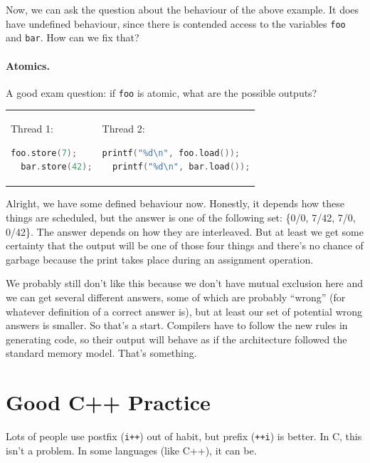 \documentclass[a4paper]{report}
\begin{document}
Now, we can ask the question about the behaviour of the above example.
It does have undefined behaviour, since there is contended access to
the variables {\tt foo} and {\tt bar}. How can we fix that?

\paragraph{Atomics.}
A good exam question: if {\tt foo} is atomic, what are the possible outputs? 
    
    \begin{tabular}{ll}
      \begin{minipage}{.25\textwidth}
        Thread 1:
        \begin{lstlisting}[language=C]
  foo.store(7);
  bar.store(42);
        \end{lstlisting}
      \end{minipage} &
      \begin{minipage}{.45\textwidth}
        Thread 2:
        \begin{lstlisting}[language=C]
  printf("%d\n", foo.load());
  printf("%d\n", bar.load());
        \end{lstlisting}
      \end{minipage}
    \end{tabular}

Alright, we have some defined behaviour now.  Honestly, it depends how these things are scheduled, but the answer is one of the following set: \{0/0, 7/42, 7/0,  0/42\}. The answer depends on how they are interleaved. But at least we get some certainty that the output will be one of those four things and there's no chance of garbage because the print takes place during an assignment operation. 

We probably still don't like this because we don't have mutual exclusion here and we can get several different answers, some of which are probably ``wrong'' (for whatever definition of a correct answer is), but at least our set of potential wrong answers is smaller. So that's a start. Compilers have to follow the new rules in generating code, so their output will behave as if the architecture followed the standard memory model. That's something. 

\section*{Good C++ Practice}
Lots of people use postfix ({\tt i++}) out of habit, but prefix ({\tt ++i}) is better.
In C, this isn't a problem. 
In some languages (like C++), it can be.
\end{document}
